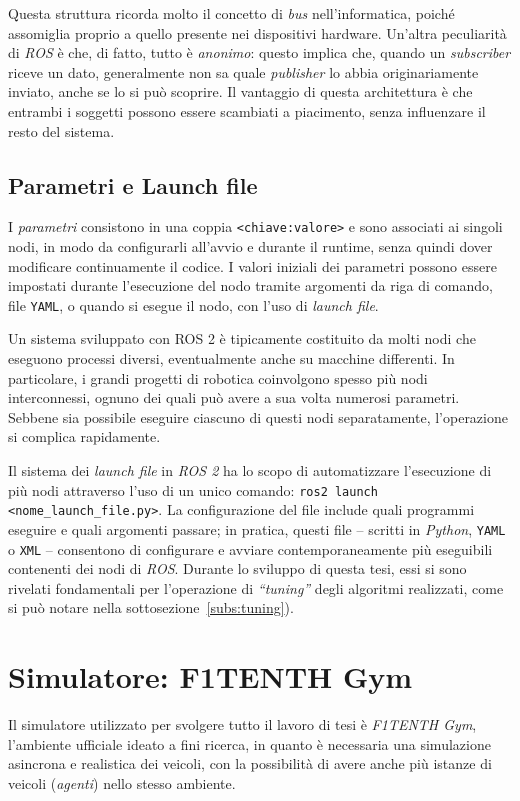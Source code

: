 Questa struttura ricorda molto il concetto di \textit{bus} nell'informatica, poiché assomiglia 
proprio a quello presente nei dispositivi hardware.
Un'altra peculiarità di \textit{ROS} è che, di fatto, tutto è \textit{anonimo}: questo implica 
che, quando un \textit{subscriber} riceve un dato, generalmente non sa quale 
\textit{publisher} lo abbia originariamente inviato, anche se lo si può scoprire. 
Il vantaggio di questa architettura è che entrambi i soggetti possono essere scambiati a piacimento, senza influenzare il resto del sistema.

\subsection{Parametri e Launch file}
I \textit{parametri} consistono in una coppia \verb|<chiave:valore>| e sono associati ai singoli nodi, in modo da configurarli all’avvio e durante il runtime, senza quindi
dover modificare continuamente il codice.
I valori iniziali dei parametri possono essere impostati durante l'esecuzione del 
nodo tramite argomenti da riga di comando, file \verb|YAML|, o quando si esegue
il nodo, con l'uso di \textit{launch file}.

Un sistema sviluppato con ROS 2 è tipicamente costituito da molti nodi che eseguono 
processi diversi, eventualmente anche su macchine differenti. 
In particolare, i grandi progetti di robotica coinvolgono spesso più nodi
interconnessi, ognuno dei quali può avere a sua volta numerosi parametri.
Sebbene sia possibile eseguire ciascuno di questi nodi separatamente, l'operazione 
si complica rapidamente.

Il sistema dei \textit{launch file} in \textit{ROS 2} ha lo scopo di automatizzare
l'esecuzione di più nodi attraverso l'uso di un unico comando: \verb|ros2 launch <nome_launch_file.py>|. 
La configurazione del file include quali programmi eseguire e quali argomenti passare; 
in pratica, questi file -- scritti in \textit{Python}, \verb|YAML| o \verb|XML| --
consentono di configurare e avviare contemporaneamente più eseguibili contenenti
dei nodi di \textit{ROS}. Durante lo sviluppo di questa tesi, essi si sono rivelati
fondamentali per l'operazione di \textit{``tuning''} degli algoritmi realizzati, come si può notare nella sottosezione~\ref{subs:tuning}).

\section{Simulatore: F1TENTH Gym}
Il simulatore utilizzato per svolgere tutto il lavoro di tesi è \textit{F1TENTH Gym}, 
l'ambiente ufficiale ideato a fini ricerca, in quanto è necessaria una simulazione 
asincrona e realistica dei veicoli, con la possibilità di avere anche più istanze di veicoli 
(\textit{agenti}) nello stesso ambiente.

